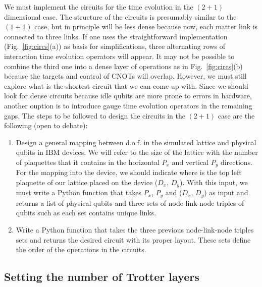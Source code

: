 \documentclass[a4paper]{article}
\begin{document}
We must implement the circuits for the time evolution in the $(2+1)$ dimensional case. The structure of the circuits is presumably similar to the $(1+1)$ case, but in principle will be less dense because now, each matter link is connected to three links. If one uses the straightforward implementation (Fig.~\ref{fig:circs}(a)) as basis for simplifications, three alternating rows of interaction time evolution operators will appear. It may not be possible to combine the third one into a dense layer of operations as in Fig.~\ref{fig:circs}(b) because the targets and control of CNOTs will overlap. However, we must still explore what is the shortest circuit that we can come up with. Since we should look for dense circuits because idle qubits are more prone to errors in hardware, another ouption is to introduce gauge time evolution operators in the remaining gaps. The steps to be followed to design the circuits in the $(2+1)$ case are the following (open to debate):

\begin{enumerate}
    \item Design a general mapping between d.o.f. in the simulated lattice and physical qubits in IBM devices. We will refer to the size of the lattice with the number of plaquettes that it contains in the horizontal $P_x$ and vertical $P_y$ directions. For the mapping into the device, we should indicate where is the top left plaquette of our lattice placed on the device ($D_x$, $D_y$). With this input, we must write a Python function that takes $P_x$, $P_y$ and ($D_x$, $D_y$) as input and returns a list of physical qubits and three sets of node-link-node triples of qubits such as each set contains unique links.
    \item Write a Python function that takes the three previous node-link-node triples sets and returns the desired circuit with its proper layout. These sets define the order of the operations in the circuits.
\end{enumerate}

\subsection{Setting the number of Trotter layers}
\end{document}
